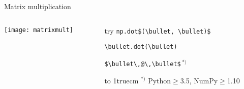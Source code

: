 \begin{frame}[fragile]{Matrix multiplication}
 \begin{columns}
  \begin{column}{0.6\linewidth}
   \begin{center}
    \texttt{[image: matrixmult]}
   \end{center}
  \end{column}%
  \begin{column}{0.4\linewidth}

   \vspace{0.4truecm}
   try \lstinline{np.dot$(\bullet, \bullet)$}\\
   \strut\hphantom{try\ }\lstinline{\bullet.dot(\bullet)}\\
   \strut\hphantom{try\ }\lstinline{$\bullet\,@\,\bullet$}\,$^{*)}$
   
   \vspace{0.7truecm}
   \hbox to 1truecm{\hrulefill}
   \scriptsize{$^{*)}$ Python$\geq$3.5, NumPy$\geq$1.10}
   \vspace{1truecm}
  \end{column}
 \end{columns}
\end{frame}


